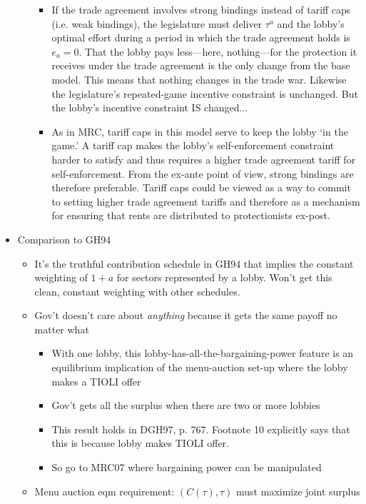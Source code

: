\documentclass[12pt]{article}
\begin{document}
\begin{itemize}
\begin{itemize}
					\begin{itemize}
						\item If the trade agreement involves strong bindings instead of tariff caps (i.e. weak bindings), the legislature must deliver $\tau^a$ and the lobby's optimal effort during a period in which the trade agreement holds is $e_a = 0$. That the lobby pays less---here, nothing---for the protection it receives under the trade agreement is the only change from the base model. This means that nothing changes in the trade war. Likewise the legislature's repeated-game incentive constraint is unchanged. But the lobby's incentive constraint IS changed...
						\item As in MRC, tariff caps in this model serve to keep the lobby `in the game.' A tariff cap makes the lobby's self-enforcement constraint harder to satisfy and thus requires a higher trade agreement tariff for self-enforcement. From the ex-ante point of view, strong bindings are therefore preferable. Tariff caps could be viewed as a way to commit to setting higher trade agreement tariffs and therefore as a mechanism for ensuring that rents are distributed to protectionists ex-post.
					\end{itemize}
			\end{itemize}
		\item Comparison to GH94
			\begin{itemize}
				\item It's the truthful contribution schedule in GH94 that implies the constant weighting of $1+a$ for sectors represented by a lobby. Won't get this clean, constant weighting with other schedules.
				\item Gov't doesn't care about \textit{anything} because it gets the same payoff no matter what
					\begin{itemize}
						\item With one lobby, this lobby-has-all-the-bargaining-power feature is an equilibrium implication of the menu-auction set-up where the lobby makes a TIOLI offer
						\item Gov't gets all the surplus when there are two or more lobbies
						\item This result holds in DGH97, p. 767. Footnote 10 explicitly says that this is because lobby makes TIOLI offer.
						\item So go to MRC07 where bargaining power can be manipulated
					\end{itemize}
				\item Menu auction eqm requirement: $(C(\tau),\tau)$ must maximize joint surplus

\end{itemize}
\end{itemize}
\end{document}

